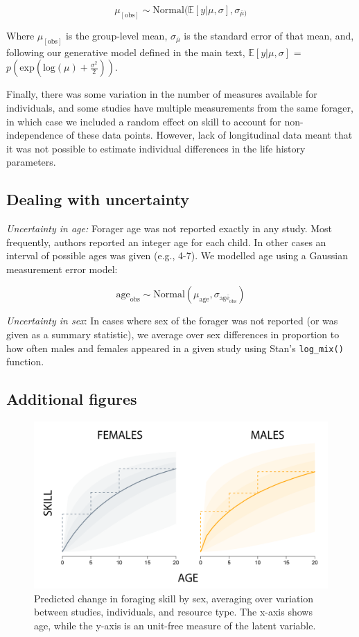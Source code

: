 $$ \mu_{[\textrm{obs}]} \sim \textrm{Normal}(\mathbb{E}[y|\mu,\sigma], \sigma_{\bar{\mu})} $$

Where $\mu_{[\textrm{obs}]}$ is the group-level mean, $\sigma_{\bar{\mu}}$ is the standard error of that mean, and, following our generative model defined in the main text, $\mathbb{E}[y|\mu,\sigma]$ = $p(\textrm{exp}( \textrm{log}(\mu) + \frac{\sigma^2}{2})) $.

Finally, there was some variation in the number of measures available for individuals, and some studies have multiple measurements from the same forager, in which case we included a random effect on skill to account for non-independence of these data points. However, lack of longitudinal data meant that it was not possible to estimate individual differences in the life history parameters.


\subsection{Dealing with uncertainty }

\emph{Uncertainty in age:} Forager age was not reported exactly in any study. Most frequently, authors reported an integer age for each child. In other cases an interval of possible ages was given (e.g., 4-7). We modelled age using a Gaussian measurement error model:

$$ \textrm{age}_{\textrm{obs}} \sim \textrm{Normal}(\mu_{\textrm{age}}, \sigma_{\bar{\textrm{age}_{\textrm{obs}}}}) $$

\emph{Uncertainty in sex}: In cases where sex of the forager was not reported (or was given as a summary statistic), we average over sex differences in proportion to how often males and females appeared in a given study using Stan's \texttt{log\_mix()} function.

\subsection{Additional figures}

\begin{figure}[h]
\centering
\includegraphics[width=12cm] {text/images/sex_diffs.png}
\renewcommand{\thefigure}{S\arabic{figure}}
\setcounter{figure}{0}
\caption{Predicted change in foraging skill by sex, averaging over variation between studies, individuals, and resource type. The x-axis shows age, while the y-axis is an unit-free measure of the latent variable.}
\label{fig:sex_diffs}
\end{figure}


